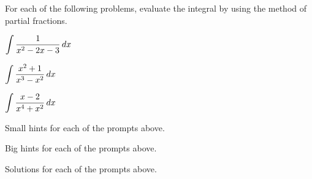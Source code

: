 \begin{activity} \label{A:5.4.1} For each of the following problems, evaluate the integral by using the method of partial fractions.

\bmthree
\ba
\item $\displaystyle \int \frac{1}{x^2 - 2x - 3} \, dx$
	
\item $\displaystyle \int \frac{x^2+1}{x^3 - x^2} \, dx$
	
\item $\displaystyle \int \frac{x-2}{x^4 + x^2}\, dx$
\ea
\emthree

\end{activity}
\begin{smallhint}
\ba
	\item Small hints for each of the prompts above.
\ea
\end{smallhint}
\begin{bighint}
\ba
	\item Big hints for each of the prompts above.
\ea
\end{bighint}
\begin{activitySolution}
\ba
	\item Solutions for each of the prompts above.
\ea
\end{activitySolution}
\aftera
